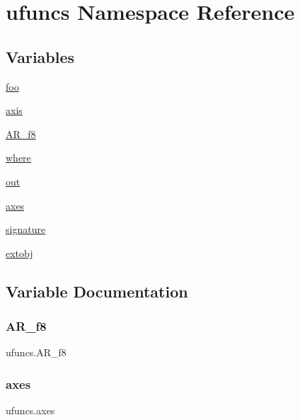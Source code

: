 \hypertarget{namespaceufuncs}{}\section{ufuncs Namespace Reference}
\label{namespaceufuncs}
\subsection*{Variables}
\begin{DoxyCompactItemize}
\item 
\hyperlink{namespaceufuncs_a7e50484ef75c928230eebc975fe2bc6b}{foo}
\item 
\hyperlink{namespaceufuncs_ab068b56285516dfbe3271f227e440c0a}{axis}
\item 
\hyperlink{namespaceufuncs_acf7cc6eac39a28bb76f84e5587cabf43}{A\+R\+\_\+f8}
\item 
\hyperlink{namespaceufuncs_ae9543b9118515cec1400166e3f83aaf2}{where}
\item 
\hyperlink{namespaceufuncs_a0dce74a651e82089600f062bc7b12668}{out}
\item 
\hyperlink{namespaceufuncs_a66c9740f6039f1a35ec568a039d2a116}{axes}
\item 
\hyperlink{namespaceufuncs_a6dc9f59b7bf34b613cb2710716542fbc}{signature}
\item 
\hyperlink{namespaceufuncs_a554113fd63def998c51532c514edccd6}{extobj}
\end{DoxyCompactItemize}


\subsection{Variable Documentation}
\mbox{\label{namespaceufuncs_acf7cc6eac39a28bb76f84e5587cabf43}} 
\subsubsection{\texorpdfstring{A\+R\+\_\+f8}{AR\_f8}}
{\footnotesize\ttfamily ufuncs.\+A\+R\+\_\+f8}

\mbox{\label{namespaceufuncs_a66c9740f6039f1a35ec568a039d2a116}} 
\subsubsection{\texorpdfstring{axes}{axes}}
{\footnotesize\ttfamily ufuncs.\+axes}


